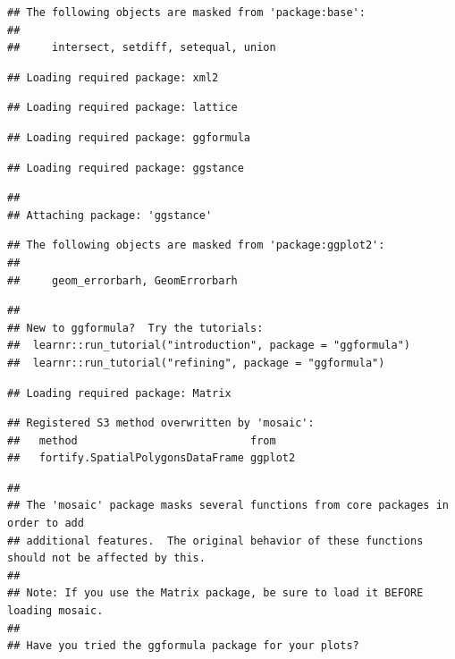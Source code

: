 \documentclass[
]{book}
\begin{document}
\begin{verbatim}
## The following objects are masked from 'package:base':
## 
##     intersect, setdiff, setequal, union
\end{verbatim}

\begin{verbatim}
## Loading required package: xml2
\end{verbatim}

\begin{verbatim}
## Loading required package: lattice
\end{verbatim}

\begin{verbatim}
## Loading required package: ggformula
\end{verbatim}

\begin{verbatim}
## Loading required package: ggstance
\end{verbatim}

\begin{verbatim}
## 
## Attaching package: 'ggstance'
\end{verbatim}

\begin{verbatim}
## The following objects are masked from 'package:ggplot2':
## 
##     geom_errorbarh, GeomErrorbarh
\end{verbatim}

\begin{verbatim}
## 
## New to ggformula?  Try the tutorials: 
## 	learnr::run_tutorial("introduction", package = "ggformula")
## 	learnr::run_tutorial("refining", package = "ggformula")
\end{verbatim}

\begin{verbatim}
## Loading required package: Matrix
\end{verbatim}

\begin{verbatim}
## Registered S3 method overwritten by 'mosaic':
##   method                           from   
##   fortify.SpatialPolygonsDataFrame ggplot2
\end{verbatim}

\begin{verbatim}
## 
## The 'mosaic' package masks several functions from core packages in order to add 
## additional features.  The original behavior of these functions should not be affected by this.
## 
## Note: If you use the Matrix package, be sure to load it BEFORE loading mosaic.
## 
## Have you tried the ggformula package for your plots?
\end{verbatim}
\end{document}
